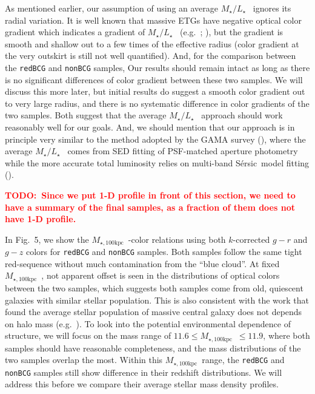 \documentclass[preprint]{aastex}
\def\ser{{S\'{e}rsic\ }}
\def\mtot{{$M_{\star,100\mathrm{kpc}}$}~}
\def\m2l{{$M_{\star}/L_{\star}$}~}
\newcommand{\todo}[1]{\textcolor{red}{\textbf{TODO:~#1}}}
\begin{document}
\begin{CJK*}{UTF8}{gbsn}
    As mentioned earlier, our assumption of using an average \m2l ignores its
    radial variation.   
    It is well known that massive ETGs have negative optical color gradient which 
    indicates a gradient of \m2l (e.g.\ \citealt{LaBarbera2012}; \citealt{DSouza2015}),
    but the gradient is smooth and shallow out to a few times of the effective 
    radius (color gradient at the very outskirt is still not well quantified). 
    And, for the comparison between the \texttt{redBCG} and \texttt{nonBCG} samples, 
    Our results should remain intact as long as there is no significant
    differences of color gradient between these two samples.
    We will discuss this more later, but initial results do suggest a smooth color
    gradient out to very large radius, and there is no systematic difference in 
    color gradients of the two samples.  
    Both suggest that the average \m2l approach should work reasonably well for
    our goals.
    And, we should mention that our approach is in principle very similar to the 
    method adopted by the GAMA survey (\citealt{Taylor2011}), where the average 
    \m2l comes from SED fitting of PSF-matched aperture photometry while the 
    more accurate total luminosity relies on multi-band \ser model fitting 
    (\citealt{Kelvin2012}). 
    
    \todo{Since we put 1-D profile in front of this section, we need to have a 
    summary of the final samples, as a fraction of them does not have 1-D profile.}
    
    In Fig.~5, we show the \mtot-color relations using both $k$-corrected $g-r$ 
    and $g-z$ colors for \texttt{redBCG} and \texttt{nonBCG} samples. 
    Both samples follow the same tight red-sequence without much contamination 
    from the ``blue cloud''.
    At fixed \mtot, not apparent offset is seen in the distributions of optical
    colors between the two samples, which suggests both samples come from old, 
    quiescent galaxies with similar stellar population.  
    This is also consistent with the work that found the average stellar 
    population of massive central galaxy does not depends on halo mass 
    (e.g.\ \citealt{Park2007}).  
    To look into the potential environmental dependence of structure, we will 
    focus on the mass range of $11.6 \le$\mtot$\le 11.9$, where both samples 
    should have reasonable completeness, and the mass distributions of the two 
    samples overlap the most.  
    Within this \mtot range, the \texttt{redBCG} and \texttt{nonBCG} samples 
    still show difference in their redshift distributions.  
    We will address this before we compare their average stellar mass 
    density profiles. 


\end{CJK*}
\end{document}

